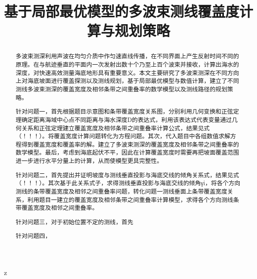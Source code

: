 \documentclass[withoutpreface,bwprint]{cumcmthesis} %
\title{基于局部最优模型的多波束测线覆盖度计算与规划策略}
\begin{document}
z

 \maketitle
 \begin{abstract}
多波束测深利用声波在均匀介质中作匀速直线传播，在不同界面上产生反射时间不同的原理。在与航迹垂直的平面内一次发射出数十个乃至上百个波束并接收，计算出海水的深度，对快速高效测量海底地形具有重要意义。本文主要研究了多波束测深在不同方向上对海底坡面进行覆盖探测以及测线规划，基于局部最优模型与数值计算，建立了不同测线多波束测深的覆盖宽度及相邻条带之间重叠率的数学模型以及测线路径的规划策略。

针对问题一，首先根据题目示意图和条带覆盖宽度关系图，分别利用几何变换和正弦定理确定距离海域中心点不同距离与海水深度D的表达式，利用该表达式代表变量通过几何关系和正弦定理建立覆盖宽度及相邻条带之间重叠率计算公式，结果见式（！！！）。将覆盖宽度计算问题转化为方程问题。其次，代入题目中各组数值求解方程得到覆盖宽度和覆盖率的解。建立了多波束测深的覆盖宽度及相邻条带之间重叠率的数学模型。最后，考虑到海底起伏不平，因此在计算覆盖宽度时需要再把坡面覆盖范围进一步进行水平分量上的计算，从而使模型更具完整性。

针对问题二，首先提出并证明坡度与测线垂直投影与海底交线的倾角关系式，结果见式（！！！）。其次基于此关系式子，求得测线垂直投影与海底交线的倾角γi，将各个方向测线的条带覆盖宽度及相邻之间重叠率问题，转化问题一测线垂面上条带覆盖宽度关系，利用题目一建立的覆盖宽度及相邻条带之间重叠率计算模型，求得各个方向测线条带覆盖宽度及相邻之间重叠率。

针对问题三，对于初始位置不定的测线，首先

针对问题四，





\end{abstract}
\end{document}
